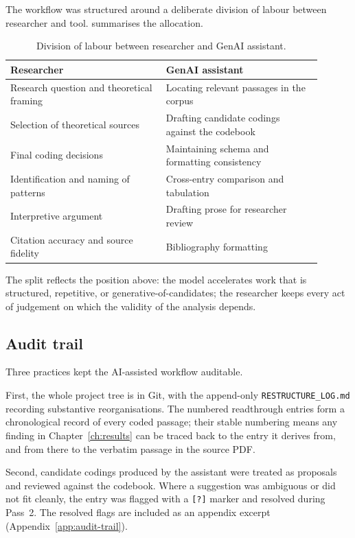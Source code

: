 The workflow was structured around a deliberate division of labour
between researcher and tool.  summarises the
allocation.

\begin{table}[ht]
  \centering
  \caption{Division of labour between researcher and GenAI assistant.}
  \label{tab:meth-ai-division}
  \begin{tabular}{p{0.45\linewidth} p{0.45\linewidth}}
    \toprule
    \textbf{Researcher} & \textbf{GenAI assistant} \\
    \midrule
    Research question and theoretical framing & Locating relevant passages in the corpus \\
    Selection of theoretical sources           & Drafting candidate codings against the codebook \\
    Final coding decisions                     & Maintaining schema and formatting consistency \\
    Identification and naming of patterns      & Cross-entry comparison and tabulation \\
    Interpretive argument                      & Drafting prose for researcher review \\
    Citation accuracy and source fidelity      & Bibliography formatting \\
    \bottomrule
  \end{tabular}
\end{table}

The split reflects the position above: the model accelerates work that
is structured, repetitive, or generative-of-candidates; the researcher
keeps every act of judgement on which the validity of the analysis
depends.

\subsection{Audit trail}
\label{sec:meth-genai-audit}

Three practices kept the AI-assisted workflow auditable.

First, the whole project tree is in Git, with the append-only
\texttt{RESTRUCTURE\_LOG.md} recording substantive reorganisations.
The numbered readthrough entries form a chronological record of every
coded passage; their stable numbering means any finding in
Chapter~\ref{ch:results} can be traced back to the entry it derives
from, and from there to the verbatim passage in the source PDF.

Second, candidate codings produced by the assistant were treated as
proposals and reviewed against the codebook. Where a suggestion was
ambiguous or did not fit cleanly, the entry was flagged with a
\texttt{[?]} marker and resolved during Pass~2. The resolved flags are
included as an appendix excerpt (Appendix~\ref{app:audit-trail}).

